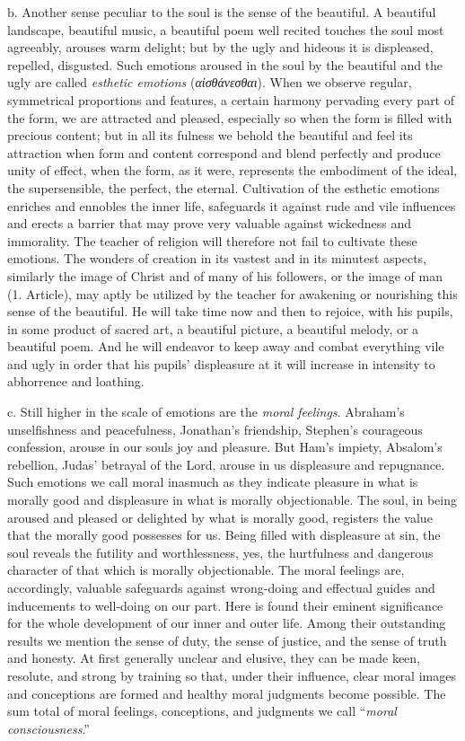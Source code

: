 b. Another sense peculiar to the soul is the sense of the beautiful. A beautiful landscape, beautiful music, a beautiful poem well recited touches the soul most agreeably, arouses warm delight; but by the ugly and hideous it is displeased, repelled, disgusted. Such emotions aroused in the soul by the beautiful and the ugly are called \emph{esthetic emotions} (\emph{αἰσθάνεσθαι}). When we observe regular, symmetrical proportions and features, a certain harmony pervading every part of the form, we are attracted and pleased, especially so when the form is filled with precious content; but in all its fulness we behold the beautiful and feel its attraction when form and content correspond and blend perfectly and produce unity of effect, when the form, as it were, represents the embodiment of the ideal, the supersensible, the
perfect, the eternal. Cultivation of the esthetic emotions enriches and ennobles the inner life, safeguards it against rude and vile influences and erects a barrier that may prove very valuable against wickedness and immorality. The teacher of religion will therefore not fail to cultivate these emotions. The wonders of creation in its vastest and in its minutest aspects, similarly the image of Christ and of many of his followers, or the image of man (1. Article), may aptly be utilized by the teacher for awakening or nourishing this sense of the beautiful. He will take time now and then to rejoice, with his pupils, in some product of sacred art, a beautiful picture, a beautiful melody, or a beautiful poem. And he will endeavor to keep away and combat everything vile and ugly in order that his pupils’ displeasure at it will increase in intensity to abhorrence and loathing.

c. Still higher in the scale of emotions are the \emph{moral feelings}. Abraham’s unselfishness and peacefulness, Jonathan’s friendship, Stephen’s courageous confession, arouse in our souls joy and pleasure. But Ham’s impiety, Absalom’s rebellion, Judas’ betrayal of the Lord, arouse in us displeasure and repugnance. Such emotions we call moral inasmuch as they indicate pleasure in what is morally good and displeasure in what is morally objectionable. The soul, in being aroused and pleased or delighted by what is morally good, registers the value that the morally good possesses for us. Being filled with displeasure at sin, the soul reveals the futility and worthlessness, yes, the hurtfulness and dangerous character of that which is morally objectionable. The moral feelings are, accordingly, valuable safeguards against wrong-doing and effectual guides and inducements to well-doing on our part. Here is found their eminent significance for the whole development of our inner and outer life. Among their outstanding results we mention the sense of duty, the sense of justice, and the sense of truth and honesty. At first
generally unclear and elusive, they can be made keen, resolute, and strong by training so that, under their influence, clear moral images and conceptions are formed and healthy moral judgments become possible. The sum total of moral feelings, conceptions, and judgments we call “\emph{moral consciousness}.”

